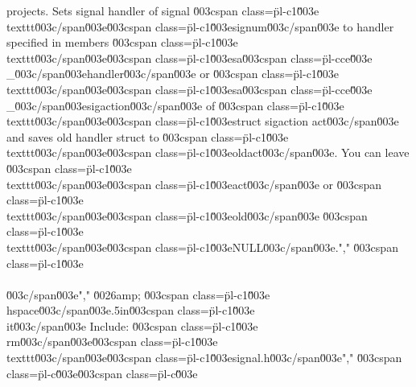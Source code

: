 projects. Sets signal handler of signal \u003cspan class=\"pl-c1\"\u003e\\texttt\u003c/span\u003e{\u003cspan class=\"pl-c1\"\u003esignum\u003c/span\u003e} to handler specified in members \u003cspan class=\"pl-c1\"\u003e\\texttt\u003c/span\u003e{\u003cspan class=\"pl-c1\"\u003esa\u003cspan class=\"pl-cce\"\u003e\\_\u003c/span\u003ehandler\u003c/span\u003e} or \u003cspan class=\"pl-c1\"\u003e\\texttt\u003c/span\u003e{\u003cspan class=\"pl-c1\"\u003esa\u003cspan class=\"pl-cce\"\u003e\\_\u003c/span\u003esigaction\u003c/span\u003e} of \u003cspan class=\"pl-c1\"\u003e\\texttt\u003c/span\u003e{\u003cspan class=\"pl-c1\"\u003estruct sigaction act\u003c/span\u003e} and saves old handler struct to \u003cspan class=\"pl-c1\"\u003e\\texttt\u003c/span\u003e{\u003cspan class=\"pl-c1\"\u003eoldact\u003c/span\u003e}.  You can leave \u003cspan class=\"pl-c1\"\u003e\\texttt\u003c/span\u003e{\u003cspan class=\"pl-c1\"\u003eact\u003c/span\u003e} or \u003cspan class=\"pl-c1\"\u003e\\texttt\u003c/span\u003e{\u003cspan class=\"pl-c1\"\u003eold\u003c/span\u003e} \u003cspan class=\"pl-c1\"\u003e\\texttt\u003c/span\u003e{\u003cspan class=\"pl-c1\"\u003eNULL\u003c/span\u003e}.","        \u003cspan class=\"pl-c1\"\u003e\\\\\u003c/span\u003e","    \u0026amp; \u003cspan class=\"pl-c1\"\u003e\\hspace\u003c/span\u003e{.5in}\u003cspan class=\"pl-c1\"\u003e\\it\u003c/span\u003e Include: \u003cspan class=\"pl-c1\"\u003e\\rm\u003c/span\u003e\u003cspan class=\"pl-c1\"\u003e\\texttt\u003c/span\u003e{\u003cspan class=\"pl-c1\"\u003esignal.h\u003c/span\u003e}","        \u003cspan class=\"pl-c\"\u003e\u003cspan class=\"pl-c\"\u003e%